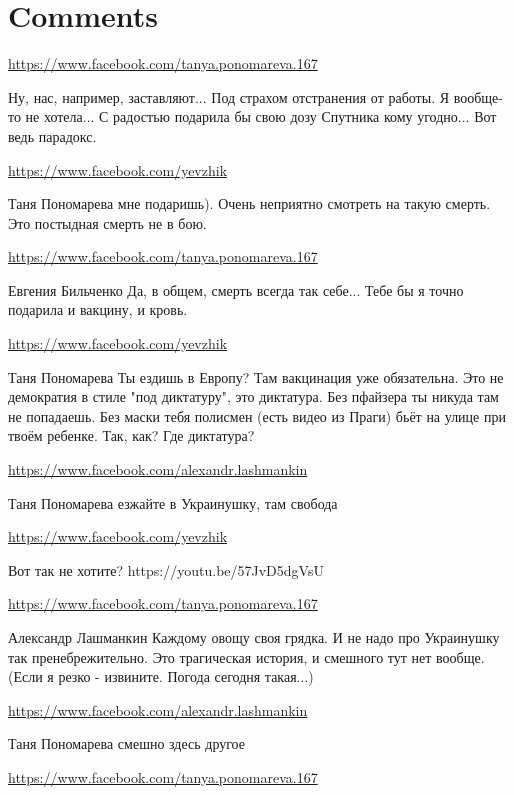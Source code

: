 \documentclass[a4paper,11pt]{extreport}
\begin{document}
\section{Comments}
\begin{itemize}
\url{https://www.facebook.com/tanya.ponomareva.167}

Ну, нас, например, заставляют... Под страхом отстранения от работы. Я вообще-то не хотела... С радостью подарила бы свою дозу Спутника кому угодно... Вот ведь парадокс.

\begin{itemize}
\url{https://www.facebook.com/yevzhik}

Таня Пономарева мне подаришь). Очень неприятно смотреть на такую смерть. Это постыдная смерть не в бою.

\url{https://www.facebook.com/tanya.ponomareva.167}

Евгения Бильченко Да, в общем, смерть всегда так себе... Тебе бы я точно подарила и вакцину, и кровь.

\url{https://www.facebook.com/yevzhik}

Таня Пономарева Ты ездишь в Европу? Там вакцинация уже обязательна. Это не демократия в стиле "под диктатуру", это диктатура. Без пфайзера ты никуда там не попадаешь. Без маски тебя полисмен (есть видео из Праги) бьёт на улице при твоём ребенке. Так, как? Где диктатура?

\url{https://www.facebook.com/alexandr.lashmankin}

Таня Пономарева езжайте в Украинушку, там свобода

\url{https://www.facebook.com/yevzhik}

Вот так не хотите? https://youtu.be/57JvD5dgVsU

\url{https://www.facebook.com/tanya.ponomareva.167}

Александр Лашманкин Каждому овощу своя грядка. И не надо про Украинушку так пренебрежительно. Это трагическая история, и смешного тут нет вообще. (Если я резко - извините. Погода сегодня такая...)

\url{https://www.facebook.com/alexandr.lashmankin}

Таня Пономарева смешно здесь другое

\url{https://www.facebook.com/tanya.ponomareva.167}


\end{itemize}
\end{itemize}
\end{document}
